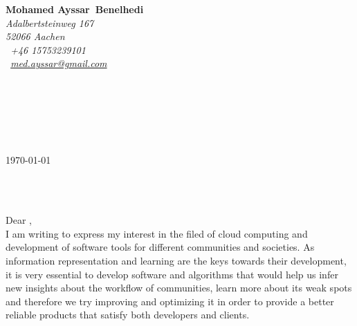 

\pagestyle{empty}


\setlength{\parindent}{0pt}
\addtolength{\parskip}{6pt}

\def\firstname{Mohamed Ayssar}
\def\familyname{Benelhedi}
\def\FileAuthor{\firstname~\familyname}
\def\FileTitle{\firstname~\familyname's Bewerbungsschreiben}
\def\FileSubject{Bewerbungsschreiben}
\def\FileKeyWords{\firstname~\familyname, Bewerbungsschreiben}

\renewcommand{\ttdefault}{pcr}



\hypersetup{pdfborder=0 0 0}


\sffamily   %
\hfill%
\begin{minipage}[t]{.6\textwidth}
	\raggedleft%
	{\bfseries {\color{firstnamecolor}\firstname}~{\color{familynamecolor}\familyname}}\\[.35ex]
	\small\itshape%
	Adalbertsteinweg 167\\
	52066 Aachen\\[.35ex]
	\Mobilefone~+46 15753239101\\
	\Letter~\href{mailto:med.ayssar@gmail.com}{med.ayssar@gmail.com}
\end{minipage}\\[0.5em]
%
%
\begin{minipage}[t]{.4\textwidth}
	\raggedright%
	\vspace*{1em}
	\firmaContact\\[.20ex]
	\firmaName\\[.35ex]
	\small%
	\firmaStreet\\
	\firmaPlzCode
\end{minipage}
%
\hfill
%
\begin{minipage}[t]{.4\textwidth}
	\raggedleft %
	\today
\end{minipage}\\[1em]
\raggedright

{\bfseries \color{familynamecolor}\jobName}\\[1.5em]

Dear \contact, \\[1em]
%
I am writing to express my interest in the filed of cloud computing and development of software tools for different communities and societies. As information representation and learning are the keys towards their development, it is very essential to develop software and algorithms that would help us infer new insights about the workflow of communities, learn more about its weak spots and therefore we try improving and optimizing it in order to provide a better reliable products that satisfy both developers and clients.

